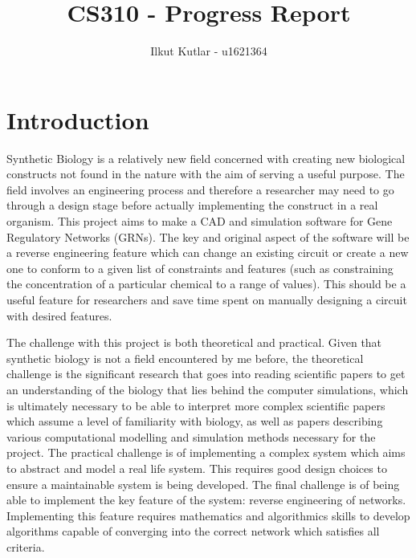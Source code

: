 \documentclass{article}
\author{Ilkut Kutlar - u1621364}
\title{CS310 - Progress Report}
\begin{document}
	\maketitle
	\tableofcontents
	
	\newpage
	
	\section{Introduction}
	
	Synthetic Biology is a relatively new field concerned with creating new biological constructs not found in the nature with the aim of serving a useful purpose. The field involves an engineering process and therefore a researcher may need to go through a design stage before actually implementing the construct in a real organism. This project aims to make a CAD and simulation software for Gene Regulatory Networks (GRNs). The key and original aspect of the software will be a reverse engineering feature which can change an existing circuit or create a new one to conform to a given list of constraints and features (such as constraining the concentration of a particular chemical to a range of values). This should be a useful feature for researchers and save time spent on manually designing a circuit with desired features.
	
	
	The challenge with this project is both theoretical and practical. Given that synthetic biology is not a field 
	encountered by me before, the theoretical challenge is the significant research that goes into reading scientific papers to get an understanding of the biology that lies behind the computer simulations, which is ultimately necessary to be able to interpret more complex scientific papers which assume a level of familiarity with biology, as well as papers describing various computational modelling and simulation methods necessary for the project. The practical challenge is of implementing a complex system which aims to abstract and model a real life system. This requires good design choices to ensure a maintainable system is being developed. The final challenge is of being able to implement the key feature of the system: reverse engineering of networks. Implementing this feature requires mathematics and algorithmics skills to develop algorithms capable of converging into the correct network which satisfies all criteria.
	
\end{document}

